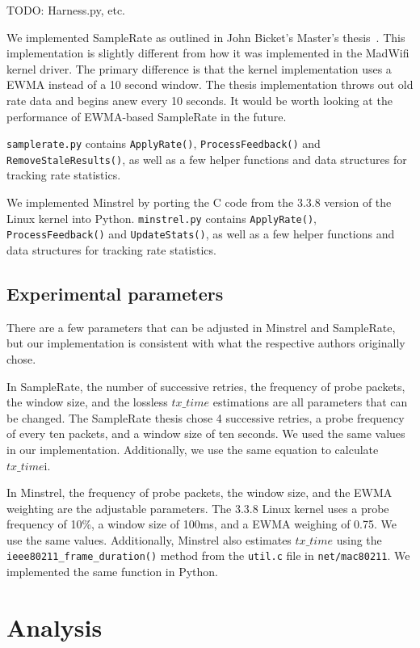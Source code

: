 \documentclass[letterpaper,twocolumn,10pt]{article}
\begin{document}
TODO: Harness.py, etc.

We implemented SampleRate as outlined in John Bicket's Master's thesis~\cite{samplerate}. This implementation is slightly different from how it was implemented in the MadWifi kernel driver. The primary difference is that the kernel implementation uses a EWMA instead of a 10 second window. The thesis implementation throws out old rate data and begins anew every 10 seconds. It would be worth looking at the performance of EWMA-based SampleRate in the future. 

\texttt{samplerate.py} contains \texttt{ApplyRate()}, \texttt{ProcessFeedback()} and  \texttt{RemoveStaleResults()}, as well as a few helper functions and data structures for tracking rate statistics. 

We implemented Minstrel by porting the C code from the 3.3.8 version of the Linux kernel into Python. \texttt{minstrel.py} contains \texttt{ApplyRate()}, \texttt{ProcessFeedback()} and  \texttt{UpdateStats()}, as well as a few helper functions and data structures for tracking rate statistics. 


\subsection{Experimental parameters}

There are a few parameters that can be adjusted in Minstrel and SampleRate, but our implementation is consistent with what the respective authors originally chose. 

In SampleRate, the number of successive retries, the frequency of probe packets, the window size, and the lossless $tx\_time$ estimations are all parameters that can be changed. The SampleRate thesis chose 4 successive retries, a probe frequency of every ten packets, and a window size of ten seconds. We used the same values in our implementation. Additionally, we use the same equation to calculate $tx\_time$i.

In Minstrel, the frequency of probe packets, the window size, and the EWMA weighting are the adjustable parameters. The 3.3.8 Linux kernel uses a probe frequency of 10\%, a window size of 100ms, and a EWMA weighing of 0.75. We use the same values. Additionally, Minstrel also estimates $tx\_time$ using the \texttt{ieee80211\_frame\_duration()} method from the \texttt{util.c} file in \texttt{net/mac80211}. We implemented the same function in Python.

\section{Analysis}
\end{document}
